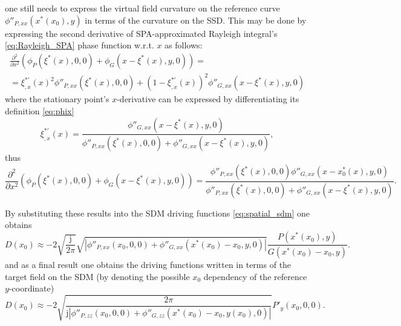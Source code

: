 \documentclass[12pt,a4paper]{article}
\newcommand{\ti}{\mathrm{j}}
\begin{document}
 one still needs to express the virtual field curvature on the reference curve $\phi''_{P,xx}(x^*(x_0),y)$
in terms of the curvature on the SSD.
This may be done by expressing the second derivative of SPA-approximated Rayleigh integral's \eqref{eq:Rayleigh_SPA} phase function w.r.t. $x$ as follows:
%
\begin{multline}
\frac{\partial^2}{\partial x^2} \left( \phi_P(\xi^*(x),0,0) + \phi_G(x-\xi^*(x),y,0) \right) = \\
=   \xi^{*'}_{,x}(x)^2 \phi''_{P,xx}(\xi^*(x),0,0) + (1-\xi^{*'}_{,x}(x))^2\phi''_{G,xx	}(x-\xi^*(x),y,0)
\end{multline}
%
where the stationary point's $x$-derivative can be expressed by differentiating its definition \eqref{eq:phix}
\begin{equation}
\xi^{*'}_{,x}(x) =  \frac{ \phi''_{G,xx}(x-\xi^*(x),y,0) }{\phi''_{P,xx}(\xi^*(x),0,0) + \phi''_{G,xx}(x-\xi^*(x),y,0) },
\end{equation}
thus
\begin{equation}
\frac{\partial^2}{\partial x^2} \left( \phi_P(\xi^*(x),0,0) + \phi_G(x-\xi^*(x),y,0) \right)  =
\frac{ \phi''_{P,xx}(\xi^*(x),0,0) \phi''_{G,xx}(x-x^*_0(x),y,0) }
{\phi''_{P,xx}(\xi^*(x),0,0) + \phi''_{G,xx}(x- \xi^*(x),y,0) } .
\end{equation}

\vspace{3mm}
By substituting these results into the SDM driving functions \eqref{eq:spatial_sdm} one obtains
\begin{equation}
D(x_0) \approx -2
\sqrt{\frac{\ti}{2\pi}} 
\sqrt{ \left| \phi''_{P,xx}(x_0,0,0) + \phi''_{G,xx}(x^*(x_0)-x_0,y,0) 	\right|}
\frac{P(x^*(x_0),y)}{G(x^*(x_0) - x_0,y)}.
\end{equation}
and as a final result one obtains the driving functions written in terms of the target field on the SDM (by denoting the possible $x_0$ dependency of the reference $y$-coordinate)
\begin{equation}
D(x_0) \approx -2
\sqrt{ \frac{2\pi}{\ti \left| \phi''_{P,zz}(x_0,0,0	) + \phi''_{G,zz}(x^*(x_0) - x_0,y(x_0),0) \right|}}
 P'_y(x_0,0,0).
\label{eq:SDM_rayleigh}
\end{equation}
\end{document}
